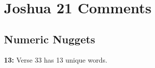 \section{Joshua 21 Comments}

\subsection{Numeric Nuggets}
\textbf{13: } Verse 33 has 13 unique words.

